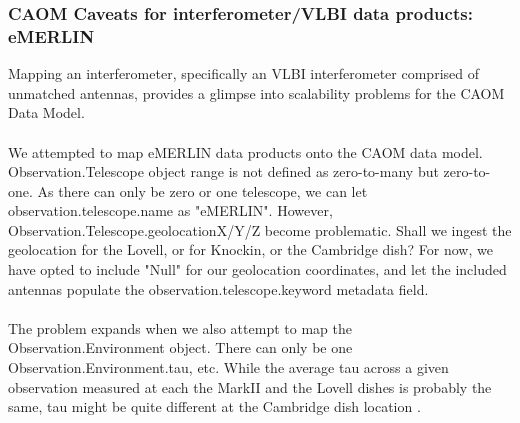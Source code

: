\subsubsection{CAOM Caveats for interferometer/VLBI data products: eMERLIN}
Mapping an interferometer, specifically an VLBI interferometer comprised of unmatched antennas, provides a glimpse into scalability problems for the CAOM Data Model.
\\
\\We attempted to map eMERLIN data products onto the CAOM data model.  Observation.Telescope object range is not defined as zero-to-many but zero-to-one.  As there can only be zero or one telescope, we can let observation.telescope.name as "eMERLIN".  However, Observation.Telescope.geolocationX/Y/Z become problematic.  Shall we ingest the geolocation for the Lovell, or for Knockin, or the Cambridge dish?  For now, we have opted to include "Null" for our geolocation coordinates, and let the included antennas populate the observation.telescope.keyword metadata field. 
\\
\\The problem expands when we also attempt to map the Observation.Environment object.  There can only be one Observation.Environment.tau, etc.  While the average tau across a given observation measured at each the MarkII and the Lovell dishes is probably the same, tau might be quite different at the Cambridge dish location .   
